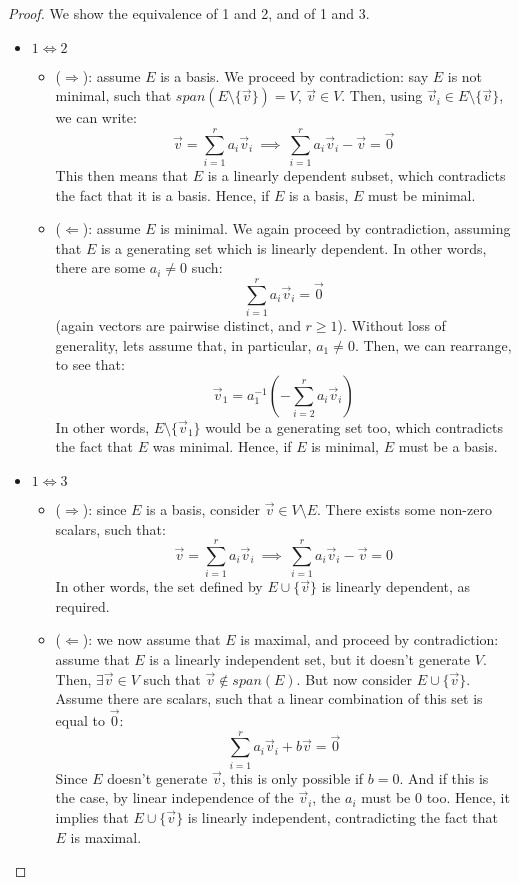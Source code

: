\documentclass{exam}
\begin{document}
\begin{proof} 

We show the equivalence of 1 and 2, and of 1 and 3.

\begin{itemize}
    \item $1 \iff 2$
    \begin{itemize}
        \item ($\Longrightarrow$): assume $E$ is a basis. We proceed by contradiction: say $E$ is not minimal, such that $span(E \setminus \{\vec{v}\}) = V$, $\vec{v} \in V$. Then, using $\vec{v}_i \in E \setminus \{\vec{v}\}$, we can write:
        \[
        \vec{v} = \sum_{i = 1}^r a_i\vec{v}_i \ \implies \ \sum_{i = 1}^r a_i\vec{v}_i - \vec{v} = \vec{0}
        \]
        This then means that $E$ is a linearly dependent subset, which contradicts the fact that it is a basis. Hence, if $E$ is a basis, $E$ must be minimal.
        \item ($\Longleftarrow$): assume $E$ is minimal. We again proceed by contradiction, assuming that $E$ is a generating set which is linearly dependent. In other words, there are some $a_i \neq 0$ such:
        \[
        \sum_{i = 1}^r a_i\vec{v}_i = \vec{0}
        \]
        (again vectors are pairwise distinct, and $r \geq 1$). Without loss of generality, lets assume that, in particular, $a_1 \neq 0$. Then, we can rearrange, to see that:
        \[
        \vec{v}_1 = a_1^{-1}\left(-\sum_{i = 2}^r a_i\vec{v}_i\right)
        \]
        In other words, $E \setminus \{\vec{v}_1\}$ would be a generating set too, which contradicts the fact that $E$ was minimal. Hence, if $E$ is minimal, $E$ must be a basis.
    \end{itemize}
    \item $1 \iff 3$
    \begin{itemize}
        \item ($\Longrightarrow$): since $E$ is a basis, consider $\vec{v} \in V \setminus E$. There exists some non-zero scalars, such that:
        \[
        \vec{v} = \sum_{i = 1}^r a_i\vec{v}_i \ \implies \ \sum_{i = 1}^r a_i\vec{v}_i - \vec{v} = 0
        \]
        In other words, the set defined by $E \cup \{\vec{v}\}$ is linearly dependent, as required.
        \item ($\Longleftarrow$): we now assume that $E$ is maximal, and proceed by contradiction: assume that $E$ is a linearly independent set, but it doesn't generate $V$. Then, $\exists \vec{v} \in V$ such that $\vec{v} \not \in span(E)$. But now consider $E \cup \{\vec{v}\}$. Assume there are scalars, such that a linear combination of this set is equal to $\vec{0}$:
        \[
        \sum_{i = 1}^r a_i\vec{v}_i + b\vec{v} = \vec{0}
        \]
        Since $E$ doesn't generate $\vec{v}$, this is only possible if $b = 0$. And if this is the case, by linear independence of the $\vec{v}_i$, the $a_i$ must be 0 too. Hence, it implies that $E \cup \{\vec{v}\}$ is linearly independent, contradicting the fact that $E$ is maximal.
    \end{itemize}
\end{itemize}

\end{proof}
\end{document}
